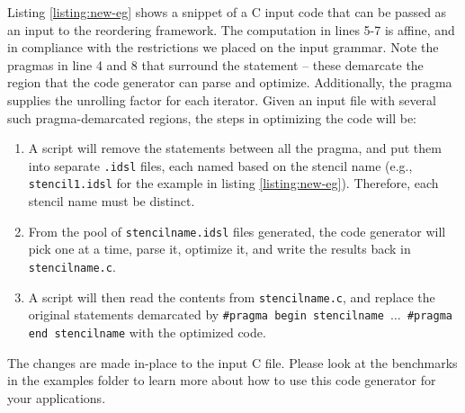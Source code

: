 Listing \ref{listing:new-eg} shows a snippet of a C input code that can be
passed as an input to the reordering framework. The computation in lines 5-7 is
affine, and in compliance with the restrictions we placed on the input grammar.
Note the pragmas in line 4 and 8 that surround the statement -- these demarcate
the region that the code generator can parse and optimize. Additionally, the
pragma supplies the unrolling factor for each iterator. Given an input file
with several such pragma-demarcated regions, the steps in optimizing the code
will be: 

\begin{enumerate} 
\item A script will remove the statements between all the pragma, and put them
into separate \texttt{.idsl} files, each named based on the stencil name (e.g.,
\texttt{stencil1.idsl} for the example in listing \ref{listing:new-eg}).
Therefore, each stencil name must be distinct.
\item From the pool of \texttt{stencilname.idsl} files generated, the code
generator will pick one at a time, parse it, optimize it, and write the results
back in \texttt{stencilname.c}.  
\item A script will then read the contents from \texttt{stencilname.c}, and
replace the original statements demarcated by \texttt{\#pragma begin
stencilname $\ldots$ \#pragma end stencilname} with the optimized code. 
\end{enumerate} 
The changes are made in-place to the input C file.
Please look at the benchmarks in the examples folder to learn more about how to use this
code generator for your applications. 
 

